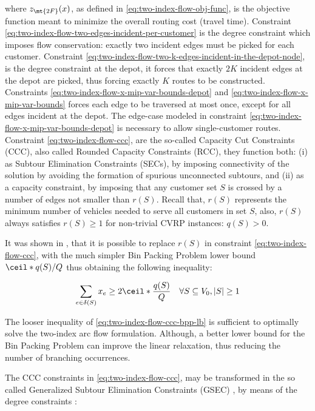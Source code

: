 where $z_\mt{2F}(x)$, as defined in \eqref{eq:two-index-flow-obj-func}, is the objective function meant to minimize the overall routing cost (travel time).
Constraint \eqref{eq:two-index-flow-two-edges-incident-per-customer} is the degree constraint which imposes flow conservation: exactly two incident edges must be picked for each customer.
Constraint \eqref{eq:two-index-flow-two-k-edges-incident-in-the-depot-node}, is the degree constraint at the depot, it forces that exactly $2K$ incident edges at the depot are picked, thus forcing exactly $K$ routes to be constructed.
Constraints \eqref{eq:two-index-flow-x-mip-var-bounds-depot} and \eqref{eq:two-index-flow-x-mip-var-bounds} forces each edge to be traversed at most once,
except for all edges incident at the depot.
The edge-case modeled in constraint \eqref{eq:two-index-flow-x-mip-var-bounds-depot} is necessary to allow single-customer routes.
Constraint \eqref{eq:two-index-flow-ccc}, are the so-called Capacity Cut Constraints (CCC), also called Rounded Capacity Constraints (RCC), they function both:
(i) as Subtour Elimination Constraints (SECs), by imposing connectivity of the solution by avoiding the formation of spurious unconnected subtours,
and (ii) as a capacity constraint, by imposing that any customer set $S$ is crossed by a number of edges not smaller than $r(S)$.
Recall that, $r(S)$ represents the minimum number of vehicles needed to serve all customers in set $S$,
also, $r(S)$ always satisfies $r(S) \ge 1$ for non-trivial CVRP instances: $q(S) > 0$.

It was shown in \textcite{cornuejols1993}, that it is possible to replace $r(S)$ in constraint
\eqref{eq:two-index-flow-ccc}, with the much simpler Bin Packing Problem lower bound $\ceil*{q(S) / Q}$
thus obtaining the following inequality:

\begin{equation}\label{eq:two-index-flow-ccc-bpp-lb}
	\sum_{e \in \delta(S)} x_e \ge 2 \ceil*{\frac{q(S)}{Q}}   \quad \forall S \subseteq V_0, |S| \ge 1
\end{equation}

The looser inequality of \cref{eq:two-index-flow-ccc-bpp-lb} is sufficient to optimally solve
the two-index arc flow formulation.
Although, a better lower bound for the Bin Packing Problem can improve the linear
relaxation, thus reducing the number of branching occurrences.

The CCC constraints in \cref{eq:two-index-flow-ccc}, may be transformed in the so called Generalized Subtour Elimination Constraints (GSEC) \parencite{laporte1985},
by means of the degree constraints :

